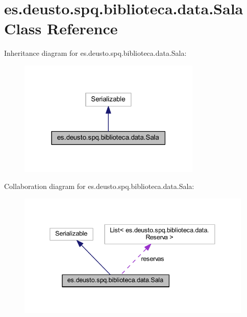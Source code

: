 \hypertarget{classes_1_1deusto_1_1spq_1_1biblioteca_1_1data_1_1_sala}{}\section{es.\+deusto.\+spq.\+biblioteca.\+data.\+Sala Class Reference}
\label{classes_1_1deusto_1_1spq_1_1biblioteca_1_1data_1_1_sala}


Inheritance diagram for es.\+deusto.\+spq.\+biblioteca.\+data.\+Sala\+:
\nopagebreak
\begin{figure}[H]
\begin{center}
\leavevmode
\includegraphics[width=247pt]{classes_1_1deusto_1_1spq_1_1biblioteca_1_1data_1_1_sala__inherit__graph}
\end{center}
\end{figure}


Collaboration diagram for es.\+deusto.\+spq.\+biblioteca.\+data.\+Sala\+:
\nopagebreak
\begin{figure}[H]
\begin{center}
\leavevmode
\includegraphics[width=338pt]{classes_1_1deusto_1_1spq_1_1biblioteca_1_1data_1_1_sala__coll__graph}
\end{center}
\end{figure}
